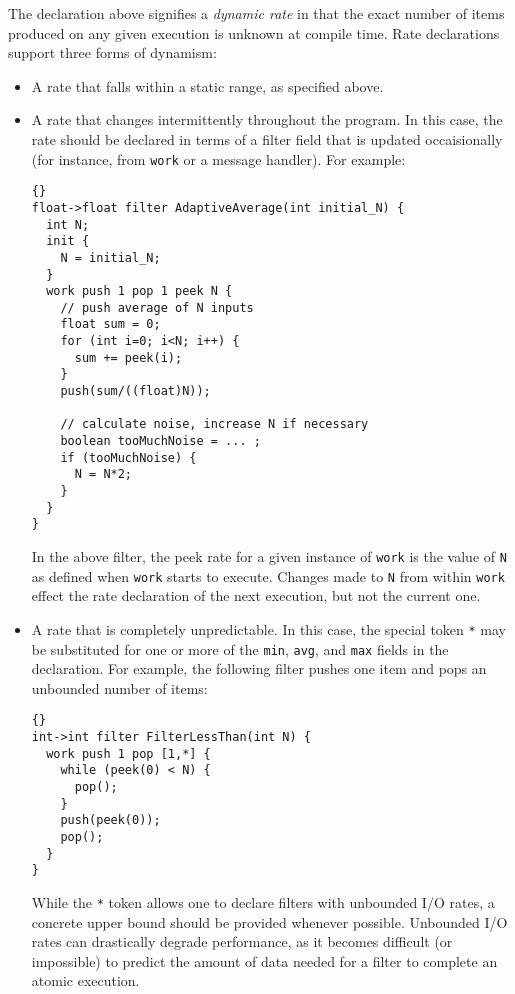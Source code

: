 \documentclass[11pt]{article}
\begin{document}
The declaration above signifies a {\it dynamic rate} in that the exact
number of items produced on any given execution is unknown at compile
time.  Rate declarations support three forms of dynamism:
\begin{itemize}

\item A rate that falls within a static range, as specified above.

\item A rate that changes intermittently throughout the program.  In
this case, the rate should be declared in terms of a filter field that
is updated occaisionally (for instance, from \lstinline|work| or a
message handler).  For example:

\begin{lstlisting}{}
float->float filter AdaptiveAverage(int initial_N) {
  int N;
  init {
    N = initial_N;
  }
  work push 1 pop 1 peek N {
    // push average of N inputs
    float sum = 0;
    for (int i=0; i<N; i++) {
      sum += peek(i);
    }
    push(sum/((float)N));

    // calculate noise, increase N if necessary
    boolean tooMuchNoise = ... ;
    if (tooMuchNoise) {
      N = N*2;
    }
  }
}
\end{lstlisting}

In the above filter, the peek rate for a given instance of
\lstinline|work| is the value of \lstinline|N| as defined when
\lstinline|work| starts to execute.  Changes made to \lstinline|N|
from within \lstinline|work| effect the rate declaration of the next
execution, but not the current one.

\item A rate that is completely unpredictable.  In this case, the
special token \lstinline|*| may be substituted for one or more of the
\lstinline|min|, \lstinline|avg|, and \lstinline|max| fields in the
declaration.  For example, the following filter pushes one item and
pops an unbounded number of items:

\begin{lstlisting}{}
int->int filter FilterLessThan(int N) {
  work push 1 pop [1,*] {
    while (peek(0) < N) {
      pop();
    }
    push(peek(0));
    pop();
  }
}
\end{lstlisting}

While the \lstinline|*| token allows one to declare filters with
unbounded I/O rates, a concrete upper bound should be provided
whenever possible.  Unbounded I/O rates can drastically degrade
performance, as it becomes difficult (or impossible) to predict the
amount of data needed for a filter to complete an atomic execution.

\end{itemize}
\end{document}
